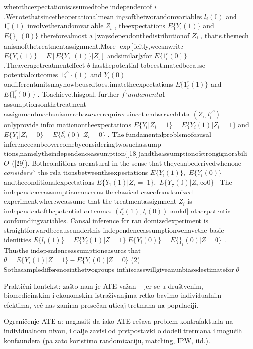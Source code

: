\documentclass[12pt, a4paper]{article}
\begin{document}
whercthcexpectationisassumedtobe independentof $i$
 .Wenotethatsincetheoperationalmean
ingsofthetworandomvariables $l_{i}(0)$
 and $1_{i}^{r}(1)$
 involvetherandomvariable $Z_{i}$
 , theexpectations
 $E\{Y_{i}(1)\}$ and $E\{\}_{i}^{-}(0)\}$
 thereforealmost $a$
 ]waysdependonthedistributionof $Z_{i}$
 , thatis.themech
anismofthetreatmentassignment.More $\exp$]icitly,wecanwrite
 $E\{Y_{i}(1)\}=E[E\{Y,\cdot(1)\}|Z_{i}]$
 andsimilar]yfor $E\{1_{i}^{r}(0)\}$
 .Theaveragetreatmenteffect $\theta$
 hasthepotential tobeestimatedbecause
 potentialoutcomes $1_{?}^{\nearrow}\cdot(1)$
 and $Y_{i}(0)$
 ondiffercntunitsmaynowbeusedtoestimatetheexpectations
 $E\{1_{i}^{r}(1)\}$
 and $E\{]_{i}^{r}(0)\}$
 . Toachievethisgoal, further $f^{\backslash }undamenta1$
 assumptionsonthetreatment
 assignmentmechanismarehoweverrequiredsincetheobservcddata $(Z_{i},l_{i}^{\nearrow})$
 onlyprovide infor
mationontheexpectations
 $E\{Y_{i}|Z_{i}=1\}=E\{Y_{i}(1)|Z_{i}=1\}$ and
 $E\{Y_{\dot{1}}|Z_{i}=0\}=E\{l_{7}^{r}(0)|Z_{i}=0\}$ .
 The fundamentalproblemofcausal inferencecanbeovercomebyconsideringtwosuchassump
tions,namelytheindependenceassumption([18])andtheassumptionofstrongignorabili $O^{}$
 ([29]).
 Bothconditions arenatural in the sense that theycanbederivedwhenone $considers^{\backslash}$
 the rela
tionsbetweentheexpectations $E\{Y_{i} (1)\},$ $E\{Y_{i}(0)\}$ andtheconditionalexpectations $E\{Y_{1}(1)|Z_{i}=$
 $1\},$ $E\{Y_{\dot{7}}(0)|Z_{i}. \infty0\}$
 . The independenceassumptionconcerns theclassical caseofrandomized
 experiment,whereweassume that the treatmentassignment $Z_{i}$
 is independentofthepotential
 outcomes $(l_{i}^{r}(1), l_{i}(0))$
 andal] otherpotential confoundingvariables. Cansal inference for ran
domizedexperiment is straightforwardbecauseunderthis independenceassumptionwehavethe
 basic identities
 $E\{l_{i} (1)\}=E\{Y_{i}(1)|Z=1\}$
 $E\{Y_{i}(0)\}=E\{\}_{i} (0)|Z=0\}$ .
 Thusthe independenceassumptionensurcs that
 $\theta=E\{Y_{i}(1)|Z=1\}-E\{Y_{i}(0)|Z=0\}$ (2)
 Sothesampledifferenceinthetwogroups inthiscasewillgiveanunbiasedestimatefor $\theta$

 Praktični kontekst: zašto nam je ATE važan – jer se u društvenim, biomedicinskim i ekonomskim istraživanjima retko bavimo 
 individualnim efektima, već nas zanima prosečan uticaj tretmana na populaciji.

Ograničenje ATE-a: naglasiti da iako ATE rešava problem kontrafaktuala na individualnom nivou, i dalje zavisi od pretpostavki 
o dodeli tretmana i mogućih konfaundera (pa zato koristimo randomizaciju, matching, IPW, itd.).
\end{document}
